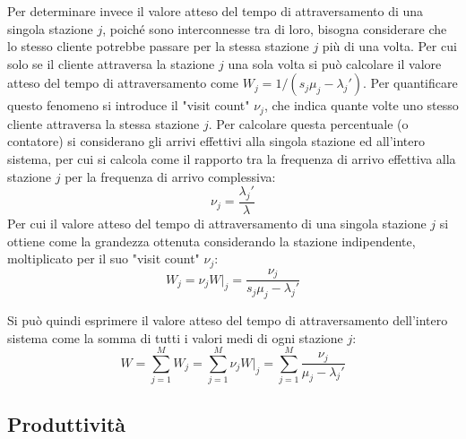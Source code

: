 \documentclass{article}
\numberwithin{equation}{subsection}
\begin{document}
Per determinare invece il valore atteso del tempo di attraversamento di una singola stazione $j$, poiché sono interconnesse tra di loro, bisogna considerare che lo stesso 
cliente potrebbe passare per la stessa stazione $j$ più di una volta. Per cui solo se il cliente attraversa la stazione $j$ una sola volta si può calcolare 
il valore atteso del tempo di attraversamento come $W_j=1/(s_j\mu_j-\lambda_j')$. Per quantificare questo fenomeno si introduce il "visit count" $\nu_j$, che indica quante volte 
uno stesso cliente attraversa la stessa stazione $j$. Per calcolare questa percentuale (o contatore) si considerano gli arrivi effettivi alla singola stazione ed all'intero 
sistema, per cui si calcola come il rapporto tra la frequenza di arrivo effettiva alla stazione $j$ per la frequenza di arrivo complessiva:
\begin{equation}
    \nu_j=\displaystyle\frac{\lambda_j'}{\lambda}
\end{equation}
Per cui il valore atteso del tempo di attraversamento di una singola stazione $j$ si ottiene come la grandezza ottenuta considerando la stazione indipendente, moltiplicato 
per il suo "visit count" $\nu_j$:
\begin{equation}
    W_j=\nu_jW\big|_j=\displaystyle\frac{\nu_j}{s_j\mu_j-\lambda_j'}
\end{equation}

Si può quindi esprimere il valore atteso del tempo di attraversamento dell'intero sistema come la somma di tutti i valori medi di ogni stazione $j$:
\begin{equation}
    W=\displaystyle\sum_{j=1}^MW_j=\sum_{j=1}^M\nu_jW\big|_j=\sum_{j=1}^M\frac{\nu_j}{\mu_j-\lambda_j'}
\end{equation}

\subsection{Produttività}
\end{document}
